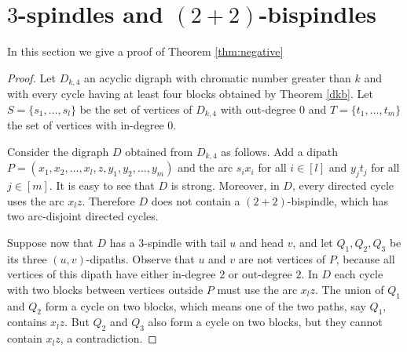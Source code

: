 \documentclass{endm}
\begin{document}
\section{$3$-spindles and $(2+2)$-bispindles}




In this section we give a proof of Theorem \ref{thm:negative}

\begin{proof}
Let $D_{k,4}$ an acyclic digraph with chromatic number greater than $k$ and with every cycle having at least four blocks obtained by Theorem \ref{dkb}.
Let $S = \{s_1, \dots,  s_l\}$ be the set of vertices of $D_{k,4}$ with out-degree 0 and $T = \{t_1, \dots, t_m\}$ the set of vertices with in-degree 0.

Consider the digraph $D$ obtained from $D_{k,4}$ as follows. Add a dipath  $P = (x_1,x_2, \dots , x_l,z,y_1,y_2,\dots, y_m)$ and the arc $s_ix_i$ for all $i\in [l]$ and
$y_jt_j$ for all $j\in [m]$. It is easy to see that $D$ is strong.
Moreover, in $D$, every directed cycle uses the arc $x_lz$. Therefore $D$ does not contain a $(2+2)$-bispindle, which has two arc-disjoint directed cycles. 

Suppose now that $D$ has a $3$-spindle with tail $u$ and head $v$, and let $Q_1, Q_2, Q_3$ be its three $(u,v)$-dipaths. Observe that $u$ and $v$ are not vertices of $P$, because all vertices of this dipath have either in-degree $2$ or out-degree $2$. In $D$ each cycle with two blocks between vertices outside $P$ must use the arc $x_lz$. The union of $Q_1$ and $Q_2$ form a cycle on two blocks, 
which means one of the two paths, say $Q_1$, contains $x_lz$. But $Q_2$ and $Q_3$ also form a cycle on two blocks, but they cannot contain $x_lz$, a contradiction.
\end{proof}
\end{document}
